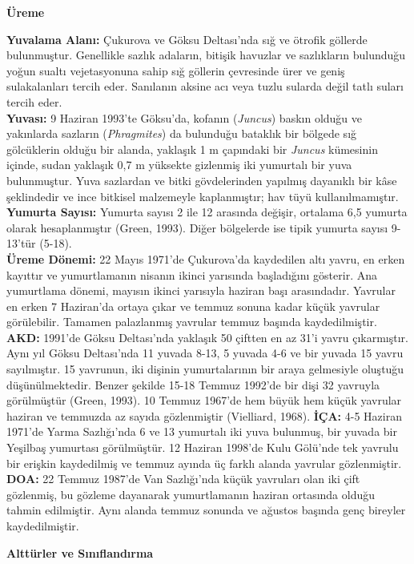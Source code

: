 \documentclass[
  a4paper,
  DIV=11,
  numbers=noendperiod]{scrreprt}
\begin{document}
\textbf{Üreme}

\textbf{Yuvalama Alanı:} Çukurova ve Göksu Deltası'nda sığ ve ötrofik
göllerde bulunmuştur. Genellikle sazlık adaların, bitişik havuzlar ve
sazlıkların bulunduğu yoğun sualtı vejetasyonuna sahip sığ göllerin
çevresinde ürer ve geniş sulakalanları tercih eder. Sanılanın aksine acı
veya tuzlu sularda değil tatlı suları tercih eder.\\
\textbf{Yuvası:} 9 Haziran 1993'te Göksu'da, kofanın (\emph{Juncus})
baskın olduğu ve yakınlarda sazların (\emph{Phragmites}) da bulunduğu
bataklık bir bölgede sığ gölcüklerin olduğu bir alanda, yaklaşık 1 m
çapındaki bir \emph{Juncus} kümesinin içinde, sudan yaklaşık 0,7 m
yüksekte gizlenmiş iki yumurtalı bir yuva bulunmuştur. Yuva sazlardan ve
bitki gövdelerinden yapılmış dayanıklı bir kâse şeklindedir ve ince
bitkisel malzemeyle kaplanmıştır; hav tüyü kullanılmamıştır.\\
\textbf{Yumurta Sayısı:} Yumurta sayısı 2 ile 12 arasında değişir,
ortalama 6,5 yumurta olarak hesaplanmıştır (Green, 1993). Diğer
bölgelerde ise tipik yumurta sayısı 9-13'tür (5-18).\\
\textbf{Üreme Dönemi:} 22 Mayıs 1971'de Çukurova'da kaydedilen altı
yavru, en erken kayıttır ve yumurtlamanın nisanın ikinci yarısında
başladığını gösterir. Ana yumurtlama dönemi, mayısın ikinci yarısıyla
haziran başı arasındadır. Yavrular en erken 7 Haziran'da ortaya çıkar ve
temmuz sonuna kadar küçük yavrular görülebilir. Tamamen palazlanmış
yavrular temmuz başında kaydedilmiştir. \textbf{AKD:} 1991'de Göksu
Deltası'nda yaklaşık 50 çiftten en az 31'i yavru çıkarmıştır. Aynı yıl
Göksu Deltası'nda 11 yuvada 8-13, 5 yuvada 4-6 ve bir yuvada 15 yavru
sayılmıştır. 15 yavrunun, iki dişinin yumurtalarının bir araya
gelmesiyle oluştuğu düşünülmektedir. Benzer şekilde 15-18 Temmuz 1992'de
bir dişi 32 yavruyla görülmüştür (Green, 1993). 10 Temmuz 1967'de hem
büyük hem küçük yavrular haziran ve temmuzda az sayıda gözlenmiştir
(Vielliard, 1968). \textbf{İÇA:} 4-5 Haziran 1971'de Yarma Sazlığı'nda 6
ve 13 yumurtalı iki yuva bulunmuş, bir yuvada bir Yeşilbaş yumurtası
görülmüştür. 12 Haziran 1998'de Kulu Gölü'nde tek yavrulu bir erişkin
kaydedilmiş ve temmuz ayında üç farklı alanda yavrular gözlenmiştir.
\textbf{DOA:} 22 Temmuz 1987'de Van Sazlığı'nda küçük yavruları olan iki
çift gözlenmiş, bu gözleme dayanarak yumurtlamanın haziran ortasında
olduğu tahmin edilmiştir. Aynı alanda temmuz sonunda ve ağustos başında
genç bireyler kaydedilmiştir.

\textbf{Alttürler ve Sınıflandırma}
\end{document}

